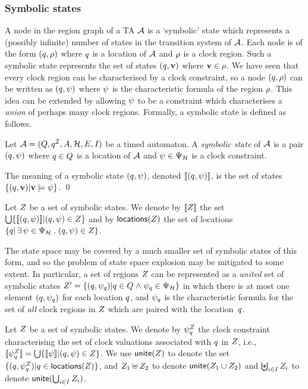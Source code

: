 {\subsubsection{Symbolic states}
A node in the region graph of a TA $\AA$ is a `symbolic' state which
represents a (possibly infinite) number of states in the transition
system of $\AA$. Each node is of the form $(q, \rho)$ where
$q$ is a location of $\AA$ and $\rho$ is a clock region. Such a
symbolic state represents the set of states $(q,\mathbf{v})$ where
$\mathbf{v} \in \rho$. We have seen that every clock region can be
characterised by a clock constraint, so a node $(q,\rho)$ can be
written as $(q,{\psi})$ where ${\psi}$ is the characteristic
formula of the region $\rho$. This idea can be extended by allowing
${\psi}$ to be a constraint which characterises a \emph{union} of
perhaps many clock regions. Formally, a symbolic state is defined
as follows.
\begin{definition}
Let $\AA = (\tglocs,\tgiloc,\Actions,\tgclks,\tgedges,\tginv)$ be a 
timed automaton. A \emph{symbolic state} of $\AA$ is a pair 
$(q,{\psi})$ where $q \in Q$ is a location of $\AA$
and $\clkcond \in \ClockConstraints$ is a clock constraint.

The meaning of a  symbolic state $(q,{\psi})$, denoted 
${\lbrack\!\lbrack}(q,{\psi}){\rbrack\!\rbrack}$, is the set of states
$\{(q,\mathbf{v}) | \mathbf{v} \models {\psi}\}$.  
\qed
\end{definition}

Let $Z$ be a set of symbolic states. We denote by ${\lbrack\!\lbrack}Z{\rbrack\!\rbrack}$ the
set $\bigcup \{{\lbrack\!\lbrack}(q,{\psi}){\rbrack\!\rbrack} | (q,{\psi}) \in
Z\}$ and by $\mathop{\sf locations}(Z)$ the set of locations 
$\{\tgloc | \exists \clkcond \in \ClockConstraints \such (\tgloc,\clkcond) \in \Z\}$. 

The state space may be covered by a much smaller set of symbolic
states of this form, and so the problem of state space explosion may be
mitigated to some extent.  In particular, a set of regions $Z$ can be
represented as a \emph{united} set of symbolic states $\Z' =
\{(\tgloc,\clkcond_\tgloc) | \tgloc \in \tglocs \land \clkcond_\tgloc
\in \ClockConstraints\}$ in which there is at most one element 
$(q,{\psi}_q)$ for each location $q$, and
${\psi}_q$ is the characteristic formula for the set of \emph{all}
clock regions in $Z$ which are paired with the location~$q$. 

Let $Z$ be a set of symbolic states. We denote by
${\psi}_q^Z$ the clock constraint characterising the set of 
clock valuations associated with $q$ in $Z$, i.e.,
${\lbrack\!\lbrack}{\psi}_q^Z{\rbrack\!\rbrack} = \bigcup\{{\lbrack\!\lbrack}{\psi}{\rbrack\!\rbrack} | (q,{\psi}) \in Z \}$.
We use $\mathop{\sf unite}(Z)$ to denote the set 
$\{(q, {\psi}_q^Z) | q \in \mathop{\sf locations}(Z)\}$, and
$Z_1 \uplus Z_2$ to denote
$\mathop{\sf unite} (Z_1 \cup Z_2)$ and $\biguplus_{i \in I} Z_i$ to denote
$\mathop{\sf unite}(\bigcup_{i \in I} Z_i)$.

}
